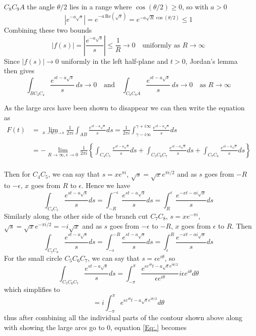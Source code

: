 $C_8C_9A$ the angle $\theta/2$ lies in a range where $\cos(\theta/2) \geq 0$,
so with $a > 0$
\begin{equation}
    |e^{-a\sqrt{s}}| = e^{-a\,\mathrm{Re}(\sqrt{s})}
    = e^{-a\sqrt{R}\cos(\theta/2)} \leq 1
\end{equation}
Combining these two bounds
\begin{equation}
    |f(s)| = \left|\frac{e^{-a\sqrt{s}}}{s}\right| \leq \frac{1}{R} \to 0
    \quad \text{uniformly as } R \to \infty
\end{equation}
Since $|f(s)| \to 0$ uniformly in the left half-plane and $t > 0$, Jordan's
lemma then gives
\begin{equation}
    \int_{BC_3C_4} \frac{e^{st-a\sqrt{s}}}{s}\,ds \to 0
    \quad \text{and} \quad
    \int_{C_8C_9A} \frac{e^{st-a\sqrt{s}}}{s}\,ds \to 0
    \quad \text{as } R \to \infty
\end{equation}

As the large arcs have been shown to disappear we can then write the equation as
\\
\begin{align}
    F(t)&=\lim_{_{R\rightarrow\infty,\epsilon\rightarrow0}}\frac{1}{2\pi i}\int_{AB}\frac{e^{st-a\sqrt{s}}}{s}ds=\frac{1}{2\pi i}\int^{\gamma+i\infty}_{\gamma-i\infty}\frac{e^{st-a\sqrt{s}}}{s}ds \nonumber \\
    \nonumber\\
        &=-\lim_{R\rightarrow\infty,\epsilon\rightarrow0}\frac{1}{2\pi i}\left\{\int_{C_4C_5}\frac{e^{st-a\sqrt{s}}}{s}ds+\int_{C_5C_6C_7}\frac{e^{st-a\sqrt{s}}}{s}ds+\int_{C_7C_8}\frac{e^{st-a\sqrt{s}}}{s}ds\right\} \label{Eq:.}
\end{align}
\\
Then for $C_4C_5$, we can say that $s=xe^{\pi i}$, $\sqrt{s}=\sqrt{x}e^{\pi i/2}$ and as $s$ goes from $-R$ to $-\epsilon$, $x$ goes from $R$ to $\epsilon$. Hence we have 
$$\int_{C_4C_5}\frac{e^{st-a\sqrt{s}}}{s}ds=\int^{-\epsilon}_{-R}\frac{e^{st-a\sqrt{s}}}{s}ds=\int^{\epsilon}_{R}\frac{e^{-xt-ai\sqrt{x}}}{s}ds$$
Similarly along the other side of the branch cut $C_7C_8$, $s=xe^{-\pi i}$, $\sqrt{s}=\sqrt{x}e^{-\pi i/2}=-i\sqrt{x}$ and as $s$ goes from $-\epsilon$ to $-R$, $x$ goes from $\epsilon$ to $R$. Then $$\int_{C_7C_8}\frac{e^{st-a\sqrt{s}}}{s}ds=\int^{-R}_{-\epsilon}\frac{e^{st-a\sqrt{s}}}{s}ds=\int^{R}_{\epsilon}\frac{e^{-xt-ai\sqrt{x}}}{s}ds$$
For the small circle $C_5C_6C_7$, we can say that $s=\epsilon e^{i\theta}$, so  $$\int_{C_5C_6C_7}\frac{e^{st-a\sqrt{s}}}{s}ds=\int^{\pi}_{-\pi}\frac{e^{\epsilon e^{i\theta}t-a\sqrt{\epsilon}e^{i\theta/2}}}{\epsilon e^{i\theta}}i\epsilon e^{i\theta}d\theta$$
which simplifies to
$$=i\int^{\pi}_{-\pi}e^{\epsilon e^{i\theta}t-a\sqrt{\epsilon}e^{i\theta/2}}d\theta$$
thus after combining all the individual parts of the contour shown above along with showing the large arcs go to $0$, equation \ref{Eq:.} becomes 

